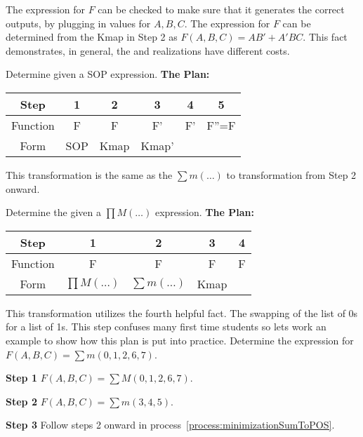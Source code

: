 The \POSmin expression for $F$ can be checked to make sure that
it generates the correct outputs, by plugging in values for $A,B,C$.
The \SOPmin expression
for $F$ can be determined from the Kmap in Step 2 as
$F(A,B,C)=AB'+A'BC$.  This fact demonstrates, in general,
the \SOPmin and \POSmin realizations have different costs.

\begin{process}{Determine \POSmin given a SOP expression.}
\label{process:minimizationSOPToPOS}
\textbf{The Plan:}

\begin{tabular}{|c|c|c|c|c|c|}\hline
Step	  & 1  & 2  & 3  & 4  & 5  \\ \hline
Function  & F  & F  & F'  & F' &  F''=F \\ \hline
Form	  & SOP & Kmap & Kmap' & \SOPmin & \POSmin \\ \hline
\end{tabular}
\vspace{0.2cm}

This transformation is the same as the $\sum m(\ldots)$ to \POSmin
transformation from Step 2 onward.
\end{process}

\begin{process}{Determine the \POSmin given a $\prod M(\ldots)$ expression.}
\label{process:minimizationProdToPOS}
\textbf{The Plan:}

\begin{tabular}{|c|c|c|c|c|}\hline
Step	  & 1  & 2  & 3  & 4     \\ \hline
Function  & F  & F  & F  & F  \\ \hline
Form	  & $\prod M(\ldots)$ & $\sum m(\ldots)$ & Kmap & \SOPmin \\ \hline
\end{tabular}
\vspace{0.2cm}

This transformation utilizes the fourth helpful fact.  The swapping of the
list of 0s for a list of 1s.  This step confuses many first time students so 
lets work an example to show how this plan is put into practice.
Determine the \POSmin expression for $F(A,B,C) = \sum m(0,1,2,6,7)$.

\textbf{Step 1} $F(A,B,C) = \sum M(0,1,2,6,7)$.

\textbf{Step 2} $F(A,B,C) = \sum m(3,4,5)$.

\textbf{Step 3} Follow steps 2 onward in process~\ref{process:minimizationSumToPOS}.
\end{process}


